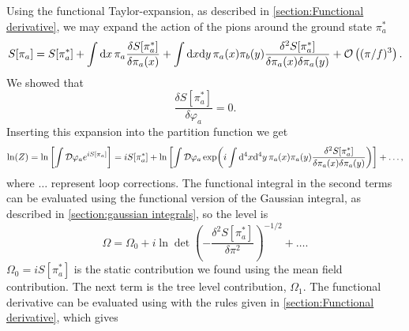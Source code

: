 Using the functional Taylor-expansion, as described in \autoref{section:Functional derivative}, we may expand the action of the pions around the ground state $\pi_a^* $
\begin{equation}
    S[\pi_a]
    = 
    S[\pi_a^*] 
    + \int \dd x \, \pi_a  \frac{\delta S[\pi_a^*]}{\delta \pi_a(x)}
    + \int \dd x \dd y \, \pi_a(x) \pi_b(y)
    \frac{\delta^2 S[\pi_a^*]}{\delta \pi_a(x) \delta \pi_a(y)}
    + \Oh[3]{(\pi/f)}.
\end{equation} 
We showed that
\begin{equation}
    \frac{\delta S[\pi_a^*]}{\delta \varphi_a} = 0.
\end{equation}
Inserting this expansion into the partition function we get
\begin{equation}
    \ln(Z) = \ln\left[ \int \D \varphi_a e^{i S[\pi_a]} \right]
    = i S[\pi_a^*] + \ln\left[
        \int \D \varphi_a 
        \exp(
            i \int \dd^4 x \dd^4 y \, \pi_a(x) \pi_a(y)
            \frac{\delta^2 S[\pi_a^*]}{\delta \pi_a(x) \delta \pi_a(y)}
            ) 
    \right]
    + \dots,
\end{equation}
where $\dots$ represent loop corrections.
The functional integral in the second terms can be evaluated using the functional version of the Gaussian integral, as described in \autoref{section:gaussian integrals}, so the level is
\begin{equation}
    \label{Free energy to second order}
    \Omega 
    = \Omega_0
    + i\ln{\det\left( - \frac{\delta^2 S[\pi_a^*]}{\delta \pi^2} \right)}^{-1/2}+ \dots.
\end{equation}
$\Omega_0 = iS[\pi_a^* ]$ is the static contribution we found using the mean field contribution.
The next term is the tree level contribution, $\Omega_1$.
The functional derivative can be evaluated using with the rules given in \autoref{section:Functional derivative}, which gives
